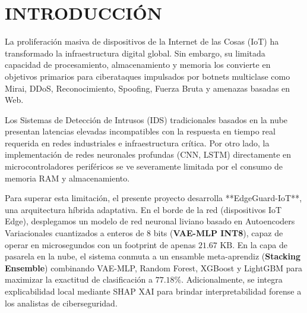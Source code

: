 \section{INTRODUCCIÓN}

La proliferación masiva de dispositivos de la Internet de las Cosas (IoT) ha transformado la infraestructura digital global. Sin embargo, su limitada capacidad de procesamiento, almacenamiento y memoria los convierte en objetivos primarios para ciberataques impulsados por botnets multiclase como Mirai, DDoS, Reconocimiento, Spoofing, Fuerza Bruta y amenazas basadas en Web.

Los Sistemas de Detección de Intrusos (IDS) tradicionales basados en la nube presentan latencias elevadas incompatibles con la respuesta en tiempo real requerida en redes industriales e infraestructura crítica. Por otro lado, la implementación de redes neuronales profundas (CNN, LSTM) directamente en microcontroladores periféricos se ve severamente limitada por el consumo de memoria RAM y almacenamiento.

Para superar esta limitación, el presente proyecto desarrolla **EdgeGuard-IoT**, una arquitectura híbrida adaptativa. En el borde de la red (dispositivos IoT Edge), desplegamos un modelo de red neuronal liviano basado en Autoencoders Variacionales cuantizados a enteros de 8 bits (\textbf{VAE-MLP INT8}), capaz de operar en microsegundos con un footprint de apenas $21.67\text{ KB}$. En la capa de pasarela en la nube, el sistema conmuta a un ensamble meta-aprendiz (\textbf{Stacking Ensemble}) combinando VAE-MLP, Random Forest, XGBoost y LightGBM para maximizar la exactitud de clasificación a $77.18\%$. Adicionalmente, se integra explicabilidad local mediante SHAP XAI para brindar interpretabilidad forense a los analistas de ciberseguridad.
